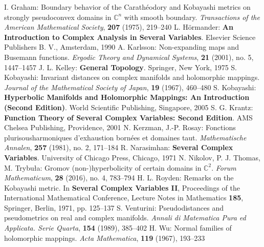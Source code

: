 \begin{thebibliography}{widest entry}
   I. Graham: Boundary behavior of the Carathéodory and Kobayashi metrics on strongly pseudoconvex domains in $\mathbb{C}^n$ with smooth boundary. \textit{Transactions of the American Mathematical Society}, \textbf{207} (1975), 219--240
   L. Hörmander: \textbf{An Introduction to Complex Analysis in Several Variables}. Elsevier Science Publishers B. V., Amsterdam, 1990
   A. Karlsson: Non-expanding maps and Busemann functions. \textit{Ergodic Theory and Dynamical Systems}, \textbf{21} (2001), no. 5, 1447--1457
   J. L. Kelley: \textbf{General Topology}. Springer, New York, 1975
   S. Kobayashi: Invariant distances on complex manifolds and holomorphic mappings. \textit{Journal of the Mathematical Society of Japan}, \textbf{19} (1967), 460--480
   S. Kobayashi: \textbf{Hyperbolic Manifolds and Holomorphic Mappings: An Introduction (Second Edition)}. World Scientific Publishing, Singapore, 2005
   S. G. Krantz: \textbf{Function Theory of Several Complex Variables: Second Edition}. AMS Chelsea Publishing, Providence, 2001
   N. Kerzman, J.-P. Rosay: Fonctions plurisousharmoniques d'exhaustion bornées et domaines taut. \textit{Mathematische Annalen}, \textbf{257} (1981), no. 2, 171--184
   R. Narasimhan: \textbf{Several Complex Variables}. University of Chicago Press, Chicago, 1971
   N. Nikolov, P. J. Thomas, M. Trybuła: Gromov (non-)hyperbolicity of certain domains in $\mathbb{C}^2$. \textit{Forum Mathematicum}, \textbf{28} (2016), no. 4, 783--794
   H. L. Royden: Remarks on the Kobayashi metric. In \textbf{Several Complex Variables II}, Proceedings of the International Mathematical Conference, Lecture Notes in Mathematics \textbf{185}, Springer, Berlin, 1971, pp. 125--137
   S. Venturini: Pseudodistances and pseudometrics on real and complex manifolds. \textit{Annali di Matematica Pura ed Applicata. Serie Quarta}, \textbf{154} (1989), 385--402
   H. Wu: Normal families of holomorphic mappings. \textit{Acta Mathematica}, \textbf{119} (1967), 193--233
\end{thebibliography}
